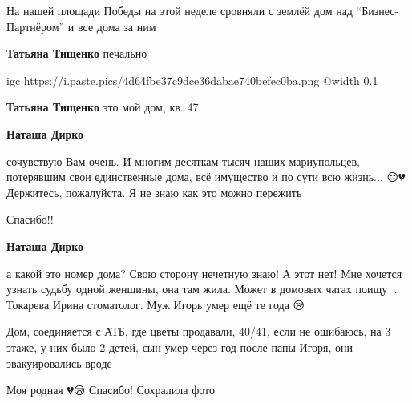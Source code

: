  
 
 
 
 

\qqSecCmt


На нашей площади Победы на этой неделе сровняли с землёй дом над
\enquote{Бизнес-Партнёром} и все дома за ним

\begin{itemize} %
\textbf{Татьяна Тищенко} печально

\ifcmt
  igc https://i.paste.pics/4d64fbe37c9dce36dabae740befec0ba.png
	@width 0.1
\fi

\textbf{Татьяна Тищенко} это мой дом, кв. 47

\begin{itemize} %
\textbf{Наташа Дирко} 

сочувствую Вам очень. И многим десяткам тысяч наших мариупольцев, потерявшим
свои единственные дома, всё имущество и по сути всю жизнь... 😔💔 Держитесь,
пожалуйста. Я не знаю как это можно пережить


Спасибо!!

\textbf{Наташа Дирко} 

а какой это номер дома? Свою сторону нечетную знаю! А этот нет! Мне хочется
узнать судьбу одной женщины, она там жила. Может в домовых чатах поищу 🤔.
Токарева Ирина стоматолог. Муж Игорь умер ещё те года 😪


Дом, соединяется с АТБ, где цветы продавали, 40/41, если не ошибаюсь, на 3
этаже, у них было 2 детей, сын умер через год после папы Игоря, они
эвакуировались вроде

\end{itemize} %

\end{itemize} %


Моя родная 💔😪 Спасибо! Сохралила фото 🥺


